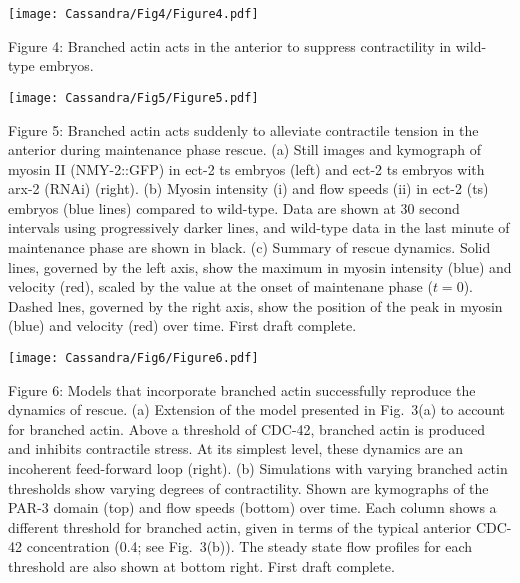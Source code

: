 \documentclass[11pt]{article}
\newcommand{\red}[1]{\color{red}#1\normalcolor}
\newcommand{\6}[1]{#1_{\text{6}}}
\newcommand{\3}[1]{#1_{\text{3}}}
\begin{document}
\begin{landscape}
\newpage 
\begin{center}
\texttt{[image: Cassandra/Fig4/Figure4.pdf]}
\end{center}
\end{landscape}

\newpage 
Figure 4: Branched actin acts in the anterior to suppress contractility in wild-type embryos. 

\newpage 
\begin{center}
\texttt{[image: Cassandra/Fig5/Figure5.pdf]}
\end{center}

\newpage 
Figure 5: Branched actin acts suddenly to alleviate contractile tension in the anterior during maintenance phase rescue. (a) Still images and kymograph of myosin II (NMY-2::GFP) in ect-2 ts embryos (left) and ect-2 ts embryos with arx-2 (RNAi) (right). (b) Myosin intensity (i) and flow speeds (ii) in ect-2 (ts) embryos (blue lines) compared to wild-type. Data are shown at 30 second intervals using progressively darker lines, and wild-type data in the last minute of maintenance phase are shown in black. (c) Summary of rescue dynamics. Solid lines, governed by the left axis, show the maximum in myosin intensity (blue) and velocity (red), scaled by the value at the onset of maintenane phase ($t=0$). Dashed lnes, governed by the right axis, show the position of the peak in myosin (blue) and velocity (red) over time.  \red{First draft complete.}

\newpage 
\begin{center}
\texttt{[image: Cassandra/Fig6/Figure6.pdf]}
\end{center}

\newpage
Figure 6: Models that incorporate branched actin successfully reproduce the dynamics of rescue. (a) Extension of the model presented in Fig.\ 3(a) to account for branched actin. Above a threshold of CDC-42, branched actin is produced and inhibits contractile stress. At its simplest level, these dynamics are an incoherent feed-forward loop (right). (b) Simulations with varying branched actin thresholds show varying degrees of contractility. Shown are kymographs of the PAR-3 domain (top) and flow speeds (bottom) over time. Each column shows a different threshold for branched actin, given in terms of the typical anterior CDC-42 concentration (0.4; see Fig.\ 3(b)). The steady state flow profiles for each threshold are also shown at bottom right. \red{First draft complete.}




\end{document}
